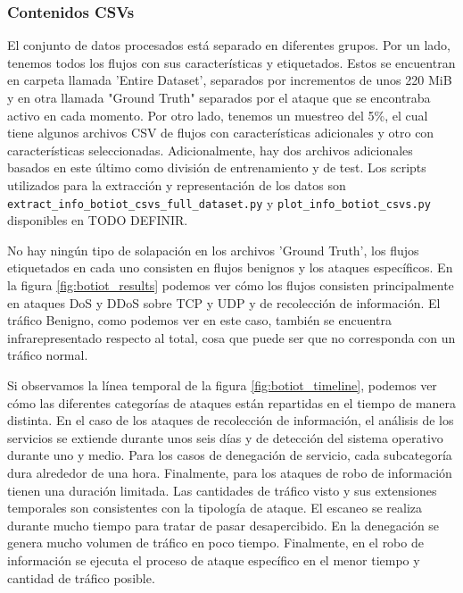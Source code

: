 \subsubsection{Contenidos CSVs}

El conjunto de datos procesados está separado en diferentes grupos. Por un lado, tenemos todos los flujos con sus características y etiquetados. Estos se encuentran en carpeta llamada 'Entire Dataset', separados por incrementos de unos 220 MiB y en otra llamada "Ground Truth" separados por  el ataque que se encontraba activo en cada momento. Por otro lado, tenemos un muestreo del 5\%, el cual tiene algunos archivos CSV de flujos con características adicionales y otro con características seleccionadas. Adicionalmente, hay dos archivos adicionales basados en este último como división de entrenamiento y de test. Los scripts utilizados para la extracción y representación de los datos son \texttt{extract\_info\_botiot\_csvs\_full\_dataset.py} y \texttt{plot\_info\_botiot\_csvs.py} disponibles en TODO DEFINIR.

No hay ningún tipo de solapación en los archivos 'Ground Truth', los flujos etiquetados en cada uno consisten en flujos benignos y los ataques específicos. En la figura \ref{fig:botiot_results} podemos ver cómo los flujos consisten principalmente en ataques DoS y DDoS sobre TCP y UDP y de recolección de información. El tráfico Benigno, como podemos ver en este caso, también se encuentra infrarepresentado respecto al total, cosa que puede ser que no corresponda con un tráfico normal. 

Si observamos la línea temporal de la figura \ref{fig:botiot_timeline}, podemos ver cómo las diferentes categorías de ataques están repartidas en el tiempo de manera distinta. En el caso de los ataques de recolección de información, el análisis de los servicios se extiende durante unos seis días y de detección del sistema operativo durante uno y medio. Para los casos de denegación de servicio, cada subcategoría dura alrededor de una hora. Finalmente, para los ataques de robo de información tienen una duración limitada. Las cantidades de tráfico visto y sus extensiones temporales son consistentes con la tipología de ataque. El escaneo se realiza durante mucho tiempo para tratar de pasar desapercibido. En la denegación se genera mucho volumen de tráfico en poco tiempo. Finalmente, en el robo de información se ejecuta el proceso de ataque específico en el menor tiempo y cantidad de tráfico posible.

